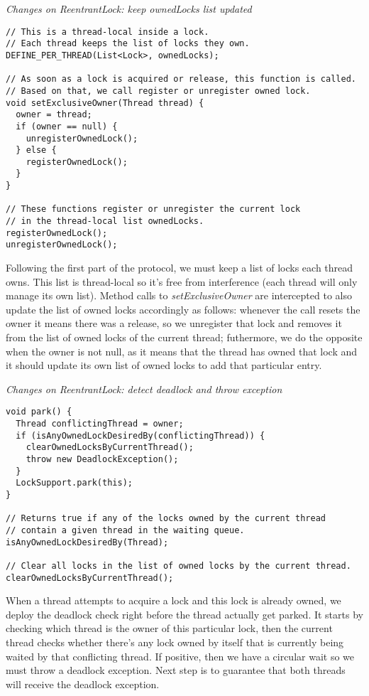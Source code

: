 \medskip
\noindent
{\it Changes on ReentrantLock: keep ownedLocks list updated}
\begin{verbatim}
// This is a thread-local inside a lock.
// Each thread keeps the list of locks they own.
DEFINE_PER_THREAD(List<Lock>, ownedLocks);

// As soon as a lock is acquired or release, this function is called.
// Based on that, we call register or unregister owned lock.
void setExclusiveOwner(Thread thread) {
  owner = thread;
  if (owner == null) {
    unregisterOwnedLock();
  } else {
    registerOwnedLock();
  }
}

// These functions register or unregister the current lock
// in the thread-local list ownedLocks.
registerOwnedLock();
unregisterOwnedLock();
\end{verbatim}

Following the first part of the protocol, we must keep a list of locks each thread owns.
This list is thread-local so it's free from interference (each thread will only manage its own list).
Method calls to \emph{setExclusiveOwner} are intercepted to also update the list of owned locks accordingly as follows:
whenever the call resets the owner it means there was a release, so we unregister that lock and removes it from the list of owned locks of the current thread;
futhermore, we do the opposite when the owner is not null, as it means that the thread has owned that lock and it should update its own list of owned locks to add that particular entry.

\medskip
\noindent
{\it Changes on ReentrantLock: detect deadlock and throw exception}
\begin{verbatim}
void park() {
  Thread conflictingThread = owner;
  if (isAnyOwnedLockDesiredBy(conflictingThread)) {
    clearOwnedLocksByCurrentThread();
    throw new DeadlockException();
  }
  LockSupport.park(this);
}

// Returns true if any of the locks owned by the current thread
// contain a given thread in the waiting queue.
isAnyOwnedLockDesiredBy(Thread);

// Clear all locks in the list of owned locks by the current thread.
clearOwnedLocksByCurrentThread();
\end{verbatim}

When a thread attempts to acquire a lock and this lock is already owned, we deploy the deadlock check right before the thread actually get parked.
It starts by checking which thread is the owner of this particular lock, then the current thread checks whether there's any lock owned by itself
that is currently being waited by that conflicting thread. If positive, then we have a circular wait so we must throw a deadlock exception.
Next step is to guarantee that both threads will receive the deadlock exception.

